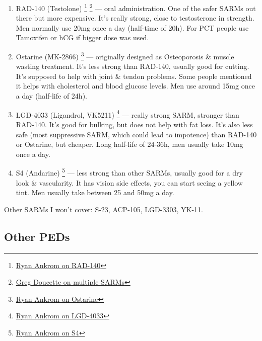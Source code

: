 \documentclass[openany, 12pt]{book}
\begin{document}
        \begin{enumerate}
		\item RAD-140 (Testolone)
                  \footnote{\href{https://www.youtube.com/watch?v=RAiR9vwJM7Y/}{Ryan Ankrom on RAD-140}}
                  \footnote{\href{https://www.youtube.com/watch?v=INFn1w18bcc/}{Greg Doucette on multiple SARMs}}
                  --- oral administration. One of the safer SARMs out there but more expensive. It's really strong, close to testosterone in strength. 
                  Men normally use 20mg once a day (half-time of 20h). For PCT people use Tamoxifen or hCG if bigger dose was used.
		\item Ostarine (MK-2866)
                  \footnote{\href{https://www.youtube.com/watch?v=Rl676k-rf\_M/}{Ryan Ankrom on Ostarine}}
                  --- originally designed as Osteoporosis \& muscle wasting treatment. It's less strong than RAD-140, usually good for cutting. It's supposed to help
                  with joint \& tendon problems. Some people mentioned it helps with cholesterol and blood glucose levels. Men use around 15mg once a day (half-life of 24h).
		\item LGD-4033 (Ligandrol, VK5211)
                  \footnote{\href{https://www.youtube.com/watch?v=Ha7gSG0lCGw/}{Ryan Ankrom on LGD-4033}}
                  --- really strong SARM, stronger than RAD-140. It's good for bulking, but does not help with fat loss. It's also less safe (most suppressive SARM, which could lead
                  to impotence) than RAD-140 or Ostarine, but cheaper. Long half-life of 24-36h, men usually take 10mg once a day.
		\item S4 (Andarine)
                  \footnote{\href{https://www.youtube.com/watch?v=1e4jVHNUnn8/}{Ryan Ankrom on S4}}
                  --- less strong than other SARMs, usually good for a dry look \& vascularity. It has vision side effects, you can start seeing a yellow tint.
                  Men usually take between 25 and 50mg a day.
        \end{enumerate}

        Other SARMs I won't cover: S-23, ACP-105, LGD-3303, YK-11.

        \subsection{Other PEDs}
\end{document}
